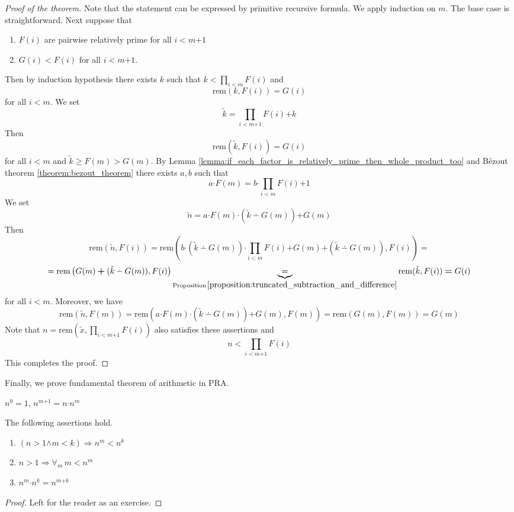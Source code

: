 \documentclass[10pt]{amsart}
\newcommand{\mforall}{\boldsymbol{\forall}}
\newcommand{\mra}{\boldsymbol{\Rightarrow}}
\newcommand{\mand}{\boldsymbol{\wedge}}
\newcommand{\mle}{\boldsymbol{<}}
\newcommand{\mge}{\boldsymbol{>}}
\newcommand{\mgeq}{\boldsymbol{\geq}}
\newcommand{\meq}{\boldsymbol{=}}
\newcommand{\mplus}{\boldsymbol{+}}
\newcommand{\mdot}{\boldsymbol{\cdot}}
\begin{document}
\begin{proof}[Proof of the theorem]
	Note that the statement can be expressed by primitive recursive formula. We apply induction on $m$. The base case is straightforward. Next suppose that
	\begin{enumerate}[label=\textbf{(\arabic*)}, leftmargin=3.0em]
		\item $F(i)$ are pairwise relatively prime for all $i \mle m \mplus 1$
		\item $G(i) \mle F(i)$ for all $i \mle m \mplus 1$.
	\end{enumerate}
	Then by induction hypothesis there exists $k$ such that $k \mle \prod_{i \mle m}F(i)$ and
	$$\mathrm{rem}\left(k,F(i)\right) \meq G(i)$$
	for all $i \mle m$. We set
	$$\tilde{k} \meq \prod_{i \mle m \mplus 1}F(i) \mplus k$$
	Then
	$$\mathrm{rem}\left(\tilde{k},F(i)\right) \meq G(i)$$
	for all $i \mle m$ and $\tilde{k} \mgeq F(m) \mge G(m)$. By Lemma \ref{lemma:if_each_factor_is_relatively_prime_then_whole_product_too} and B{\'e}zout theorem \ref{theorem:bezout_theorem} there exists $a,b$ such that
	$$a\mdot F(m) \meq b\mdot\prod_{i \mle m}F(i) \mplus 1$$
	We set
	$$\tilde{n} \meq a\mdot F(m) \mdot (\tilde{k} \dotminus G(m)) \mplus G(m)$$
	Then
	$$\mathrm{rem}\left(\tilde{n}, F(i)\right) \meq \mathrm{rem}\left(b\mdot (\tilde{k} \dotminus G(m)) \mdot \prod_{i \mle m}F(i) \mplus G(m) \mplus (\tilde{k} \dotminus G(m)), F(i)\right) =$$
	$$= \mathrm{rem}\left(G(m) \mplus (\tilde{k} \dotminus G(m)), F(i)\right) \underbrace{=}_{\mathrm{Proposition}\,\ref{proposition:truncated_subtraction_and_difference}} \mathrm{rem}(\tilde{k},F(i)) \meq G(i)$$
	for all $i \mle m$. Moreover, we have
	$$\mathrm{rem}\left(\tilde{n}, F(m)\right) \meq \mathrm{rem}\left(a\mdot F(m) \mdot (\tilde{k} \dotminus G(m)) \mplus G(m), F(m)\right) \meq \mathrm{rem}(G(m), F(m)) \meq G(m)$$
	Note that $n \meq \mathrm{rem}\left(\tilde{x},\prod_{i \mle m \mplus 1}F(i)\right)$ also satisfies these assertions and
	$$n \mle \prod_{i \mle m \mplus 1}F(i)$$
	This completes the proof.
\end{proof}
\noindent
Finally, we prove fundamental theorem of arithmetic in $\mathrm{PRA}$.

\begin{definition}
	$n^0 \meq 1,\,n^{m\mplus1} \meq n\mdot n^m$
\end{definition}

\begin{fact}\label{fact:basic_properties_of_exponential}
	The following assertions hold.
	\begin{enumerate}[label=\emph{\textbf{(\arabic*)}}, leftmargin=3.0em]
		\item $\left(n \mge 1 \mand m \mle k\right)  \mra n^m \mle n^k$
		\item $n \mge 1 \mra \mforall_m\,m \mle n^m$
		\item $n^m \mdot n^k \meq n^{m \mplus k}$
	\end{enumerate}
\end{fact}
\begin{proof}
	Left for the reader as an exercise.
\end{proof}
\end{document}
